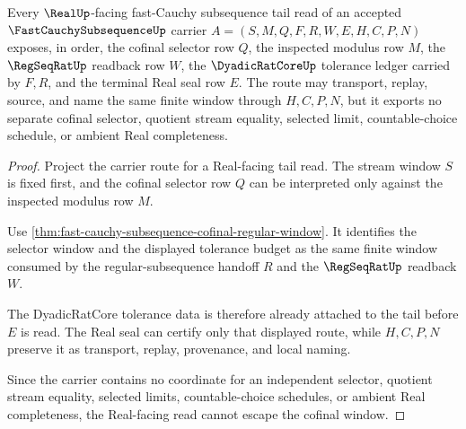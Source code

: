 \begin{theorem}
\label{thm:fast-cauchy-subsequence-tail-real-seal-cofinality}
Every $\RealUp$-facing fast-Cauchy subsequence tail read of an accepted $\FastCauchySubsequenceUp$ carrier $A=(S,M,Q,F,R,W,E,H,C,P,N)$ exposes, in order, the cofinal selector row $Q$, the inspected modulus row $M$, the $\RegSeqRatUp$ readback row $W$, the $\DyadicRatCoreUp$ tolerance ledger carried by $F,R$, and the terminal Real seal row $E$. The route may transport, replay, source, and name the same finite window through $H,C,P,N$, but it exports no separate cofinal selector, quotient stream equality, selected limit, countable-choice schedule, or ambient Real completeness.
\end{theorem}
\begin{proof}
Project the carrier route for a Real-facing tail read. The stream window $S$ is fixed first, and the cofinal selector row $Q$ can be interpreted only against the inspected modulus row $M$.

Use \autoref{thm:fast-cauchy-subsequence-cofinal-regular-window}. It identifies the selector window and the displayed tolerance budget as the same finite window consumed by the regular-subsequence handoff $R$ and the $\RegSeqRatUp$ readback $W$.

The DyadicRatCore tolerance data is therefore already attached to the tail before $E$ is read. The Real seal can certify only that displayed route, while $H,C,P,N$ preserve it as transport, replay, provenance, and local naming.

Since the carrier contains no coordinate for an independent selector, quotient stream equality, selected limits, countable-choice schedules, or ambient Real completeness, the Real-facing read cannot escape the cofinal window.
\end{proof}


